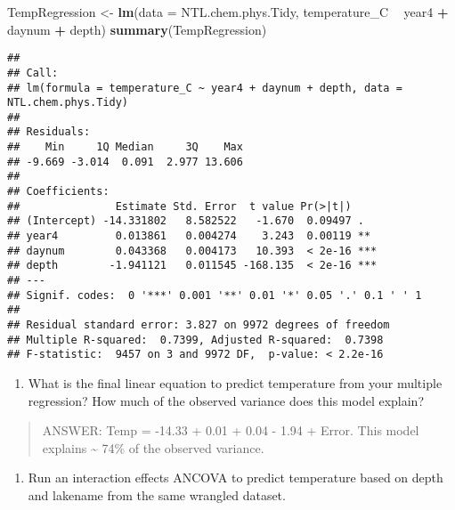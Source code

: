 \documentclass[]{article}
\newenvironment{Shaded}{\begin{snugshade}}{\end{snugshade}}
\newcommand{\KeywordTok}[1]{\textcolor[rgb]{0.13,0.29,0.53}{\textbf{#1}}}
\newcommand{\DataTypeTok}[1]{\textcolor[rgb]{0.13,0.29,0.53}{#1}}
\newcommand{\StringTok}[1]{\textcolor[rgb]{0.31,0.60,0.02}{#1}}
\newcommand{\CommentTok}[1]{\textcolor[rgb]{0.56,0.35,0.01}{\textit{#1}}}
\newcommand{\OperatorTok}[1]{\textcolor[rgb]{0.81,0.36,0.00}{\textbf{#1}}}
\newcommand{\NormalTok}[1]{#1}
\providecommand{\tightlist}{%
  \setlength{\itemsep}{0pt}\setlength{\parskip}{0pt}}
\begin{document}
\begin{Shaded}
\begin{Highlighting}[]
\NormalTok{TempRegression <-}\StringTok{ }\KeywordTok{lm}\NormalTok{(}\DataTypeTok{data =}\NormalTok{ NTL.chem.phys.Tidy, temperature_C }\OperatorTok{~}\StringTok{ }\NormalTok{year4 }\OperatorTok{+}\StringTok{ }\NormalTok{daynum }\OperatorTok{+}\StringTok{ }\NormalTok{depth)}
\KeywordTok{summary}\NormalTok{(TempRegression)}
\end{Highlighting}
\end{Shaded}

\begin{verbatim}
## 
## Call:
## lm(formula = temperature_C ~ year4 + daynum + depth, data = NTL.chem.phys.Tidy)
## 
## Residuals:
##    Min     1Q Median     3Q    Max 
## -9.669 -3.014  0.091  2.977 13.606 
## 
## Coefficients:
##               Estimate Std. Error  t value Pr(>|t|)    
## (Intercept) -14.331802   8.582522   -1.670  0.09497 .  
## year4         0.013861   0.004274    3.243  0.00119 ** 
## daynum        0.043368   0.004173   10.393  < 2e-16 ***
## depth        -1.941121   0.011545 -168.135  < 2e-16 ***
## ---
## Signif. codes:  0 '***' 0.001 '**' 0.01 '*' 0.05 '.' 0.1 ' ' 1
## 
## Residual standard error: 3.827 on 9972 degrees of freedom
## Multiple R-squared:  0.7399, Adjusted R-squared:  0.7398 
## F-statistic:  9457 on 3 and 9972 DF,  p-value: < 2.2e-16
\end{verbatim}

\begin{enumerate}
\def\labelenumi{\arabic{enumi}.}
\setcounter{enumi}{12}
\tightlist
\item
  What is the final linear equation to predict temperature from your
  multiple regression? How much of the observed variance does this model
  explain?
\end{enumerate}

\begin{quote}
ANSWER: Temp = -14.33 + 0.01 + 0.04 - 1.94 + Error. This model explains
\textasciitilde{} 74\% of the observed variance.
\end{quote}

\begin{enumerate}
\def\labelenumi{\arabic{enumi}.}
\setcounter{enumi}{13}
\tightlist
\item
  Run an interaction effects ANCOVA to predict temperature based on
  depth and lakename from the same wrangled dataset.
\end{enumerate}

\begin{Shaded}
\end{Shaded}
\end{document}
